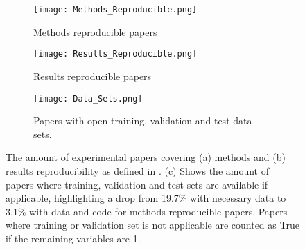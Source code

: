 \begin{figure}[!h]
\begin{center}
    \begin{subfigure}[b]{0.4\textwidth}
        \texttt{[image: Methods\_Reproducible.png]}
        \caption{Methods reproducible papers}
        \label{fig:methods_reproducible}
    \end{subfigure}
    \begin{subfigure}[b]{0.4\textwidth}
        \texttt{[image: Results\_Reproducible.png]}
        \caption{Results reproducible papers}
        \label{fig:results_reproducible}
    \end{subfigure}
    \begin{subfigure}[b]{0.4\textwidth}
        \texttt{[image: Data\_Sets.png]}
        \caption{Papers with open training, validation and test data sets.}
        \label{fig:data_sets}
    \end{subfigure}
    \caption[Amount of reproducible papers.]{The amount of experimental papers covering (a) methods and (b) results reproducibility as defined in \cite{Goodman341ps12}. (c) Shows the amount of papers where training, validation and test sets are available if applicable, highlighting a drop from 19.7\% with necessary data to 3.1\% with data and code for methods reproducible papers. Papers where training or validation set is not applicable are counted as True if the remaining variables are 1.}
    \label{fig:reproducibility}
\end{center}
\end{figure}

\cleardoublepage
